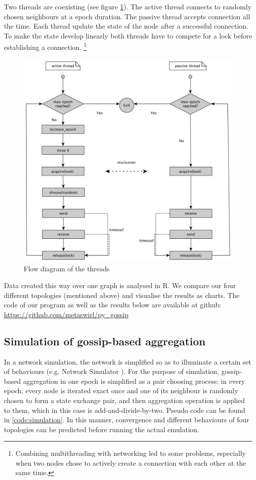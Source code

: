Two threads are coexisting (see figure \ref{fig:flow_diag}). The active thread connects to randomly chosen neighbours at a epoch duration. The passive thread accepts connection all the time. Each thread update the state of the node after a successful connection. To make the state develop linearly both threads have to compete for a lock before establishing a connection. \footnote{Combining multithreading with networking led to some problems, especially when two nodes chose to actively create a connection with each other at the same time.}
\begin{figure}[h!]
    \begin{center}
        \includegraphics[scale=0.25]{flow_diag.jpg}
    \end{center}
    \caption{Flow diagram of the threads}
    \label{fig:flow_diag}
\end{figure}

Data created this way over one graph is analysed in R. We compare our four different topologies (mentioned above) and visualise the results as charts. The code of our program as well as the results below are available at github: \url{https://github.com/metaswirl/py_gossip}

\subsection{Simulation of gossip-based aggregation}
\label{sec:simulation}
In a network simulation, the network is simplified so as to illuminate a certain set of behaviours (e.g. Network Simulator \cite{ns}). For the purpose of simulation, gossip-based aggregation in one epoch is simplified as a pair choosing process: in every epoch, every node is iterated exact once and one of its neighbour is randomly chosen to form a state exchange pair, and then aggregation operation is applied to them, which in this case is add-and-divide-by-two. Pseudo code can be found in \ref{code:simulation}. In this manner, convergence and different behaviours of four topologies can be predicted before running the actual emulation.

